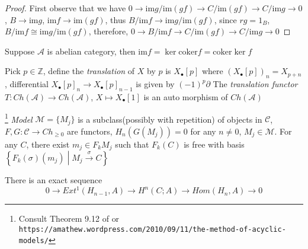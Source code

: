\documentclass[main]{subfiles}
\begin{document}
\begin{proof}
First observe that we have $0\to \mathrm{im}g/\mathrm{im}(gf)\to C/\mathrm{im}(gf)\to C/\mathrm{im}g\to0$, $B\to\mathrm{im}g$, $\mathrm{im}f\to\mathrm{im}(gf)$, thus $B/\mathrm{im}f\to\mathrm{im}g/\mathrm{im}(gf)$, since $rg=1_B$, $B/\mathrm{im}f\cong\mathrm{im}g/\mathrm{im}(gf)$, therefore, $0\to B/\mathrm{im}f\to C/\mathrm{im}(gf)\to C/\mathrm{im}g\to0$
\end{proof}

\begin{lemma}
Suppose $\mathscr A$ is abelian category, then $\mathrm{im}f=\ker\mathrm{coker}f=\mathrm{coker}\ker f$
\end{lemma}

\begin{definition}
Pick $p\in\mathbb Z$, define the \textit{translation} of $X$ by $p$ is $X_\bullet[p]$ where $(X_\bullet[p])_n=X_{p+n}$, differential $X_\bullet[p]_n\to X_\bullet[p]_{n-1}$ is given by $(-1)^p\partial$
The \textit{translation functor} $T:Ch(\mathscr A)\to Ch(\mathscr A)$, $X\mapsto X_\bullet[1]$ is an auto morphism of $Ch(\mathscr A)$
\end{definition}

\begin{theorem}\label{Acyclic model theorem}\footnote{Consult Theorem 9.12 of \cite{AnIntroductionToAlgebraicTopologyJosephJRotman} or \texttt{https://amathew.wordpress.com/2010/09/11/the-method-of-acyclic-models/}}
\textit{Model} $\mathcal M=\{M_j\}$ is a subclass(possibly with repetition) of objects in $\mathscr C$, $F,G:\mathscr C\to Ch_{\geq0}$ are functors, $H_n(G(M_j))=0$ for any $n\neq0$, $M_j\in\mathcal M$. For any $C$, there exist $m_j\in F_kM_j$ such that $F_k(C)$ is free with basis $\left\{F_k(\sigma)(m_j)\middle|M_j\xrightarrow{\sigma} C\right\}$
\end{theorem}

\begin{theorem}\label{Universal coefficient theorem for cohomology}
There is an exact sequence
\[0\to Ext^1(H_{n-1},A)\to H^n(C;A)\to Hom(H_n,A)\to0\]
\end{theorem}
\end{document}
